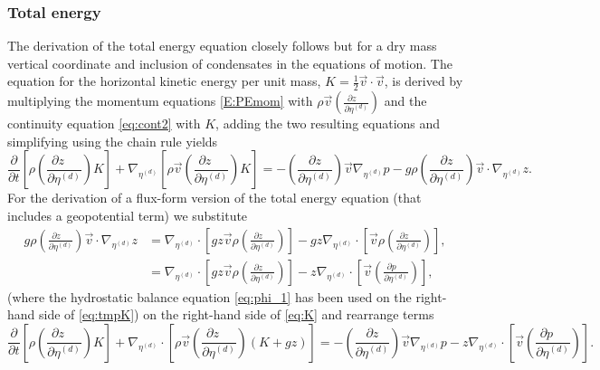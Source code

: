 \documentclass{agujournal}
\begin{document}
{\subsubsection{Total energy}
The derivation of the total energy equation closely follows \citet{K1974MWR} but for a dry mass vertical coordinate and inclusion of condensates in the equations of motion. The equation for the horizontal kinetic energy per unit mass, $K=\frac{1}{2}\vec{v}\cdot \vec{v}$, is derived by multiplying the momentum equations \eqref{E:PEmom} with $\rho \vec{v} \left( \frac{\partial z\quad }{\partial \eta^{(d)}}\right)$ and the continuity equation \eqref{eq:cont2} with $K$, adding the two resulting equations and simplifying using the chain rule yields
\begin{equation}
\frac{\partial }{\partial t}\left[ \rho \left( \frac{\partial z\quad }{\partial \eta^{(d)}}\right)K\right]+\nabla_{\eta^{(d)}} \left[ \rho \vec{v} \left( \frac{\partial z\quad }{\partial \eta^{(d)}}\right)K\right]=-\left( \frac{\partial z}{\partial \eta^{(d)}}\right)\vec{v} \nabla_{\eta^{(d)}}p-g\rho \left( \frac{\partial z}{\partial \eta^{(d)}}\right)\vec{v} \cdot \nabla_{\eta^{(d)}}z.\label{eq:K}
\end{equation}
For the derivation of a flux-form version of the total energy equation (that includes a geopotential term) we substitute
\begin{align}
g \rho \left( \frac{\partial z\quad }{\partial \eta^{(d)}}\right) \vec{v} \cdot \nabla_{\eta^{(d)}} z &= \nabla_{\eta^{(d)}}\cdot \left[ gz\vec{v}\rho  \left( \frac{\partial z\quad }{\partial \eta^{(d)}}\right) \right] - gz \nabla_{\eta^{(d)}} \cdot \left[ \vec{v}\rho  \left( \frac{\partial z\quad }{\partial \eta^{(d)}}\right) \right],\\
&=\nabla_{\eta^{(d)}}\cdot \left[ g z\vec{v}\rho  \left( \frac{\partial z\quad }{\partial \eta^{(d)}}\right) \right] -z \nabla_{\eta^{(d)}}\cdot \left[ \vec{v} \left( \frac{\partial p\quad }{\partial \eta^{(d)}}\right)\right],\label{eq:tmpK}
\end{align}
(where the hydrostatic balance equation \eqref{eq:phi_1} has been used on the right-hand side of \eqref{eq:tmpK}) on the right-hand side of \eqref{eq:K} and rearrange terms
\begin{equation}
\frac{\partial }{\partial t}\left[ \rho \left( \frac{\partial z\quad }{\partial \eta^{(d)}}\right)K\right]+\nabla_{\eta^{(d)}} \cdot \left[ \rho \vec{v} \left( \frac{\partial z\quad }{\partial \eta^{(d)}}\right) \left( K+gz \right) \right]=-\left( \frac{\partial z}{\partial \eta^{(d)}}\right)\vec{v} \nabla_{\eta^{(d)}}p - z \nabla_{\eta^{(d)}}\cdot \left[ \vec{v} \left( \frac{\partial p\quad }{\partial \eta^{(d)}}\right)\right].\label{eq:tmp1}

\end{equation}}
\end{document}
